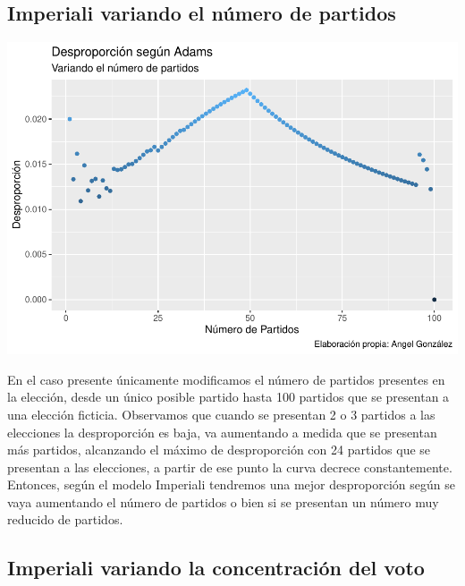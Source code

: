 \documentclass[12pt,a4paper,]{book}
\numberwithin{dummy}{section}
\theoremstyle{ocrenumbox}
\theoremstyle{blacknumex}
\theoremstyle{blacknumbox}
\theoremstyle{ocrenum}
\theoremstyle{ocrenum}
\begin{document}
\hypertarget{imperiali-variando-el-nuxfamero-de-partidos}{%
\subsection{Imperiali variando el número de
partidos}\label{imperiali-variando-el-nuxfamero-de-partidos}}

\begin{center}\includegraphics[width=0.95\linewidth]{figurasR/unnamed-chunk-32-1} \end{center}

En el caso presente únicamente modificamos el número de partidos
presentes en la elección, desde un único posible partido hasta 100
partidos que se presentan a una elección ficticia. Observamos que cuando
se presentan 2 o 3 partidos a las elecciones la desproporción es baja,
va aumentando a medida que se presentan más partidos, alcanzando el
máximo de desproporción con 24 partidos que se presentan a las
elecciones, a partir de ese punto la curva decrece constantemente.
Entonces, según el modelo Imperiali tendremos una mejor desproporción
según se vaya aumentando el número de partidos o bien si se presentan un
número muy reducido de partidos.

\hypertarget{imperiali-variando-la-concentraciuxf3n-del-voto}{%
\subsection{Imperiali variando la concentración del
voto}\label{imperiali-variando-la-concentraciuxf3n-del-voto}}
\end{document}
